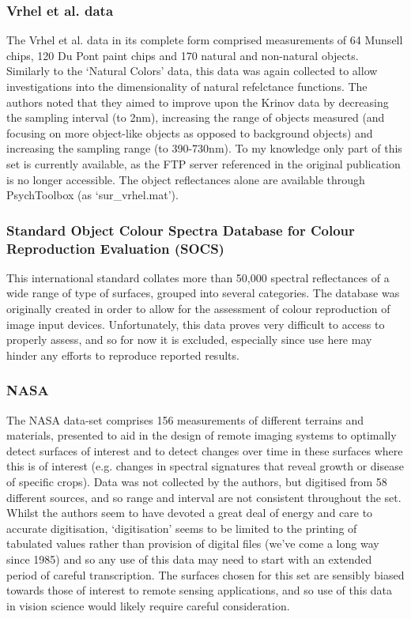 \subsubsection*{Vrhel et al. data \cite{vrhel_measurement_1994}}
The Vrhel et al. data in its complete form comprised measurements of 64 Munsell chips, 120 Du Pont paint chips and 170 natural and non-natural objects. Similarly to the `Natural Colors' data, this data was again collected to allow investigations into the dimensionality of natural refelctance functions. The authors noted that they aimed to improve upon the Krinov data by decreasing the sampling interval (to 2nm), increasing the range of objects measured (and focusing on more object-like objects as opposed to background objects) and increasing the sampling range (to 390-730nm). To my knowledge only part of this set is currently available, as the FTP server referenced in the original publication is no longer accessible. The object reflectances alone are available through PsychToolbox (as `sur\_vrhel.mat').

\subsubsection*{Standard Object Colour Spectra Database for Colour Reproduction Evaluation (SOCS) \cite{tajima_development_1998,iso/tc_130_graphic_technology_iso/tr_2003}}
This international standard collates more than 50,000 spectral reflectances of a wide range of type of surfaces, grouped into several categories. The database was originally created in order to allow for the assessment of colour reproduction of image input devices. Unfortunately, this data proves very difficult to access to properly assess, and so for now it is excluded, especially since use here may hinder any efforts to reproduce reported results.

\subsubsection*{NASA \cite{david_e._bowker_spectral_1985}}
The NASA data-set comprises 156 measurements of different terrains and materials, presented to aid in the design of remote imaging systems to optimally detect surfaces of interest and to detect changes over time in these surfaces where this is of interest (e.g. changes in spectral signatures that reveal growth or disease of specific crops). Data was not collected by the authors, but digitised from 58 different sources, and so range and interval are not consistent throughout the set. Whilst the authors seem to have devoted a great deal of energy and care to accurate digitisation, `digitisation' seems to be limited to the printing of tabulated values rather than provision of digital files (we've come a long way since 1985) and so any use of this data may need to start with an extended period of careful transcription. The surfaces chosen for this set are sensibly biased towards those of interest to remote sensing applications, and so use of this data in vision science would likely require careful consideration.

